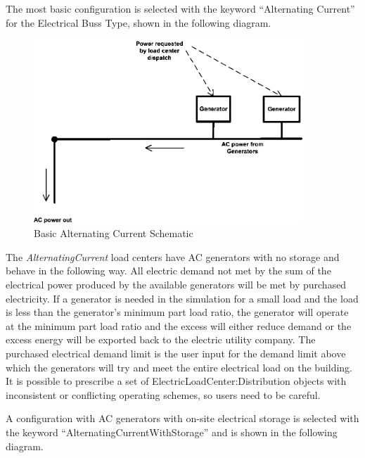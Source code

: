 The most basic configuration is selected with the keyword ``Alternating Current'' for the Electrical Buss Type, shown in the following diagram.

\begin{figure}[hbtp] %
\centering
\includegraphics[width=0.9\textwidth, height=0.9\textheight, keepaspectratio=true]{media/image7480.png}
\caption{Basic Alternating Current Schematic \protect \label{fig:basic-alternating-current-schematic}}
\end{figure}

The \emph{AlternatingCurrent} load centers have AC generators with no storage and behave in the following way. All electric demand not met by the sum of the electrical power produced by the available generators will be met by purchased electricity. If a generator is needed in the simulation for a small load and the load is less than the generator's minimum part load ratio, the generator will operate at the minimum part load ratio and the excess will either reduce demand or the excess energy will be exported back to the electric utility company. The purchased electrical demand limit is the user input for the demand limit above which the generators will try and meet the entire electrical load on the building. It is possible to prescribe a set of ElectricLoadCenter:Distribution objects with inconsistent or conflicting operating schemes, so users need to be careful.

A configuration with AC generators with on-site electrical storage is selected with the keyword ``AlternatingCurrentWithStorage'' and is shown in the following diagram.

